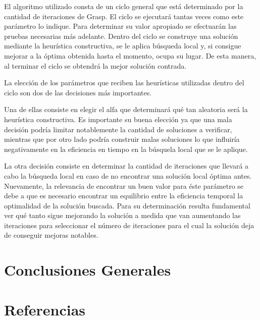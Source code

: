 \documentclass[a4paper,11pt] {article}
\begin{document}
El algoritmo utilizado consta de un ciclo general que está determinado por la cantidad de iteraciones de Grasp. El ciclo se ejecutará tantas veces como este parámetro lo indique. Para determinar su valor apropiado se efectuarán las pruebas necesarias más adelante. Dentro del ciclo se construye una solución mediante la heurística constructiva, se le aplica búsqueda local y, si consigue mejorar a la óptima obtenida hasta el momento, ocupa su lugar. De esta manera, al terminar el ciclo se obtendrá la mejor solución contrada.

La elección de los parámetros que reciben las heurísticas utilizadas dentro del ciclo son dos de las decisiones más importantes.

 Una de ellas consiste en elegir el alfa que determinará qué tan aleatoria será la heurística constructiva. Es importante su buena elección ya que una mala decisión podría limitar notablemente la cantidad de soluciones a verificar, mientras que por otro lado podría construir malas soluciones lo que influiría negativamente en la eficiencia en tiempo en la búsquela local que se le aplique.


La otra decisión consiste en determinar la cantidad de iteraciones que llevará a cabo la búsqueda local en caso de no encontrar una solución local óptima antes. Nuevamente, la relevancia de encontrar un buen valor para éste parámetro se debe a que es necesario encontrar un equilibrio entre la eficiencia temporal la optimalidad de la solución buscada. Para su determinación resulta fundamental ver qué tanto sigue mejorando la solución a medida que van aumentando las iteraciones para seleccionar el número de iteraciones para el cual la solución deja de conseguir mejoras notables.



\section*{Conclusiones Generales}

\section*{Referencias}
\end{document}
